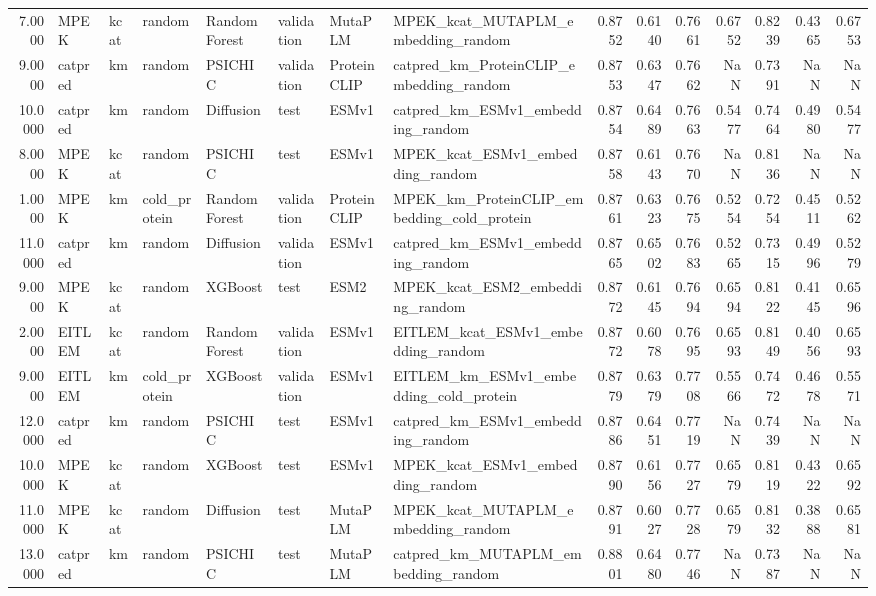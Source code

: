\begin{tabular}{rlllllllrrrrrrr}
7.0000 & MPEK & kcat & random & Random Forest & validation & MutaPLM & MPEK_kcat_MUTAPLM_embedding_random & 0.8752 & 0.6140 & 0.7661 & 0.6752 & 0.8239 & 0.4365 & 0.6753 \\
9.0000 & catpred & km & random & PSICHIC & validation & ProteinCLIP & catpred_km_ProteinCLIP_embedding_random & 0.8753 & 0.6347 & 0.7662 & NaN & 0.7391 & NaN & NaN \\
10.0000 & catpred & km & random & Diffusion & test & ESMv1 & catpred_km_ESMv1_embedding_random & 0.8754 & 0.6489 & 0.7663 & 0.5477 & 0.7464 & 0.4980 & 0.5477 \\
8.0000 & MPEK & kcat & random & PSICHIC & test & ESMv1 & MPEK_kcat_ESMv1_embedding_random & 0.8758 & 0.6143 & 0.7670 & NaN & 0.8136 & NaN & NaN \\
1.0000 & MPEK & km & cold_protein & Random Forest & validation & ProteinCLIP & MPEK_km_ProteinCLIP_embedding_cold_protein & 0.8761 & 0.6323 & 0.7675 & 0.5254 & 0.7254 & 0.4511 & 0.5262 \\
11.0000 & catpred & km & random & Diffusion & validation & ESMv1 & catpred_km_ESMv1_embedding_random & 0.8765 & 0.6502 & 0.7683 & 0.5265 & 0.7315 & 0.4996 & 0.5279 \\
9.0000 & MPEK & kcat & random & XGBoost & test & ESM2 & MPEK_kcat_ESM2_embedding_random & 0.8772 & 0.6145 & 0.7694 & 0.6594 & 0.8122 & 0.4145 & 0.6596 \\
2.0000 & EITLEM & kcat & random & Random Forest & validation & ESMv1 & EITLEM_kcat_ESMv1_embedding_random & 0.8772 & 0.6078 & 0.7695 & 0.6593 & 0.8149 & 0.4056 & 0.6593 \\
9.0000 & EITLEM & km & cold_protein & XGBoost & validation & ESMv1 & EITLEM_km_ESMv1_embedding_cold_protein & 0.8779 & 0.6379 & 0.7708 & 0.5566 & 0.7472 & 0.4678 & 0.5571 \\
12.0000 & catpred & km & random & PSICHIC & test & ESMv1 & catpred_km_ESMv1_embedding_random & 0.8786 & 0.6451 & 0.7719 & NaN & 0.7439 & NaN & NaN \\
10.0000 & MPEK & kcat & random & XGBoost & test & ESMv1 & MPEK_kcat_ESMv1_embedding_random & 0.8790 & 0.6156 & 0.7727 & 0.6579 & 0.8119 & 0.4322 & 0.6592 \\
11.0000 & MPEK & kcat & random & Diffusion & test & MutaPLM & MPEK_kcat_MUTAPLM_embedding_random & 0.8791 & 0.6027 & 0.7728 & 0.6579 & 0.8132 & 0.3888 & 0.6581 \\
13.0000 & catpred & km & random & PSICHIC & test & MutaPLM & catpred_km_MUTAPLM_embedding_random & 0.8801 & 0.6480 & 0.7746 & NaN & 0.7387 & NaN & NaN \\

\end{tabular}
